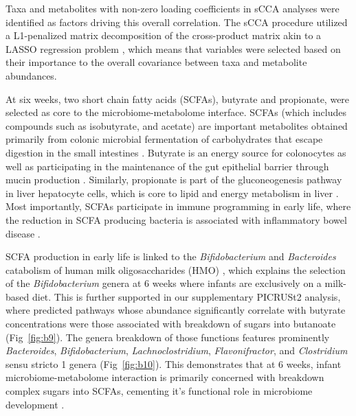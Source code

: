 Taxa and metabolites with non-zero loading coefficients in sCCA analyses were identified as factors driving this overall correlation. The sCCA procedure utilized a L1-penalized matrix decomposition of the cross-product matrix akin to a LASSO regression problem \cite{witten2019pma}, which means that variables were selected based on their importance to the overall covariance between taxa and metabolite abundances. 

At six weeks, two short chain fatty acids (SCFAs), butyrate and propionate, were selected as core to the microbiome-metabolome interface. SCFAs (which includes compounds such as isobutyrate, and acetate) are important metabolites obtained primarily from colonic microbial fermentation of carbohydrates that escape digestion in the small intestines \cite{morrison2016formation}. Butyrate is an energy source for colonocytes \cite{leblanc2017beneficial} as well as participating in the maintenance of the gut epithelial barrier through mucin production \cite{peng2009butyrate}. Similarly, propionate is part of the gluconeogenesis pathway in liver hepatocyte cells, which is core to lipid and energy metabolism in liver \cite{denbesten2013gutderived}. Most importantly, SCFAs participate in immune programming in early life, where the reduction in SCFA producing bacteria is associated with inflammatory bowel disease \cite{correa-oliveira2016regulation, schulthess2019short}. 

SCFA production in early life is linked to the \emph{Bifidobacterium} and \emph{Bacteroides} catabolism of human milk oligosaccharides (HMO) \cite{james2019metabolism, lawson2020breast, marcobal2011bacteroides}, which explains the selection of the \emph{Bifidobacterium} genera at 6 weeks where infants are exclusively on a milk-based diet. This is further supported in our supplementary PICRUSt2 analysis, where predicted pathways whose abundance significantly correlate with butyrate concentrations were those associated with breakdown of sugars into butanoate (Fig~\ref{fig:b9}). The genera breakdown of those functions features prominently \emph{Bacteroides}, \emph{Bifidobacterium}, \emph{Lachnoclostridium}, \emph{Flavonifractor}, and \emph{Clostridium} sensu stricto 1 genera (Fig~\ref{fig:b10}). This demonstrates that at 6 weeks, infant microbiome-metabolome interaction is primarily concerned with breakdown complex sugars into SCFAs, cementing it’s functional role in microbiome development \cite{stewart2018temporal}. 

